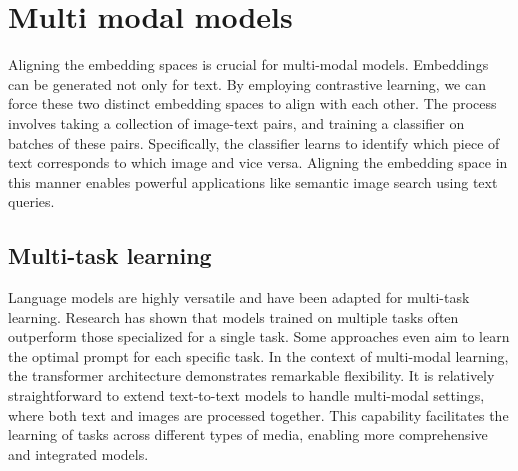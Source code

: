 \section{Multi modal models}

Aligning the embedding spaces is crucial for multi-modal models. 
Embeddings can be generated not only for text.
By employing contrastive learning, we can force these two distinct embedding spaces to align with each other. 
The process involves taking a collection of image-text pairs, and training a classifier on batches of these pairs.
Specifically, the classifier learns to identify which piece of text corresponds to which image and vice versa. 
Aligning the embedding space in this manner enables powerful applications like semantic image search using text queries.

\subsection{Multi-task learning}
Language models are highly versatile and have been adapted for multi-task learning. 
Research has shown that models trained on multiple tasks often outperform those specialized for a single task. 
Some approaches even aim to learn the optimal prompt for each specific task. 
In the context of multi-modal learning, the transformer architecture demonstrates remarkable flexibility. 
It is relatively straightforward to extend text-to-text models to handle multi-modal settings, where both text and images are processed together. 
This capability facilitates the learning of tasks across different types of media, enabling more comprehensive and integrated models.